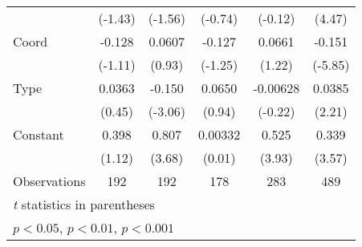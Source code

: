 {\begin{tabular}{l*{5}{c}}
                &  (-1.43)         &  (-1.56)         &  (-0.74)         &  (-0.12)         &   (4.47)         \\
[1em]
Coord           &   -0.128         &   0.0607         &   -0.127         &   0.0661         &   -0.151\sym{***}\\
                &  (-1.11)         &   (0.93)         &  (-1.25)         &   (1.22)         &  (-5.85)         \\
[1em]
Type            &   0.0363         &   -0.150\sym{**} &   0.0650         & -0.00628         &   0.0385\sym{*}  \\
                &   (0.45)         &  (-3.06)         &   (0.94)         &  (-0.22)         &   (2.21)         \\
[1em]
Constant        &    0.398         &    0.807\sym{***}&  0.00332         &    0.525\sym{***}&    0.339\sym{***}\\
                &   (1.12)         &   (3.68)         &   (0.01)         &   (3.93)         &   (3.57)         \\
\hline
Observations    &      192         &      192         &      178         &      283         &      489         \\
\hline\hline
\multicolumn{6}{l}{\footnotesize \textit{t} statistics in parentheses}\\
\multicolumn{6}{l}{\footnotesize \sym{*} \(p<0.05\), \sym{**} \(p<0.01\), \sym{***} \(p<0.001\)}\\
\end{tabular}
}
